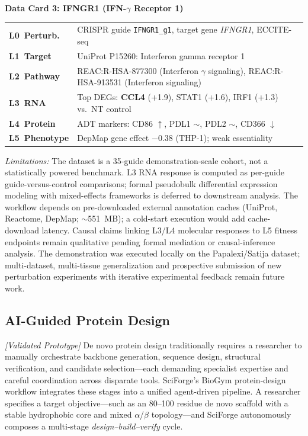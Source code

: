 \documentclass[sn-basic,Numbered,pdflatex]{sn-jnl}
\begin{document}
\vspace{6pt}

\noindent\colorbox{gray!20}{\textbf{\small Data Card 3: IFNGR1 (IFN-$\gamma$ Receptor 1)}}
\vspace{3pt}

\noindent\begin{tabular}{@{}p{2.5cm} p{\dimexpr\textwidth-2.5cm-12pt\relax}@{}}
\cellcolor{blue!15} \textbf{L0~Perturb.} & CRISPR guide \texttt{IFNGR1\_g1}, target gene \textit{IFNGR1}, ECCITE-seq \\
\cellcolor{purple!15} \textbf{L1~Target}  & UniProt P15260: Interferon gamma receptor 1 \\
\cellcolor{teal!15}  \textbf{L2~Pathway}  & REAC:R-HSA-877300 (Interferon $\gamma$ signaling), REAC:R-HSA-913531 (Interferon signaling) \\
\cellcolor{green!15} \textbf{L3~RNA}      & Top DEGs: \textbf{CCL4} (+1.9), STAT1 (+1.6), IRF1 (+1.3) vs.\ NT control \\
\cellcolor{orange!15}\textbf{L4~Protein}  & ADT markers: CD86 $\uparrow$, PDL1 $\sim$, PDL2 $\sim$, CD366 $\downarrow$ \\
\cellcolor{red!15}   \textbf{L5~Phenotype}& DepMap gene effect $-0.38$ (THP-1); weak essentiality \\
\end{tabular}
\textit{Limitations:} The dataset is a 35-guide demonstration-scale cohort, not a statistically powered benchmark. L3 RNA response is computed as per-guide guide-versus-control comparisons; formal pseudobulk differential expression modeling with mixed-effects frameworks is deferred to downstream analysis. The workflow depends on pre-downloaded external annotation caches (UniProt, Reactome, DepMap; $\sim$551~MB); a cold-start execution would add cache-download latency. Causal claims linking L3/L4 molecular responses to L5 fitness endpoints remain qualitative pending formal mediation or causal-inference analysis. The demonstration was executed locally on the Papalexi/Satija dataset; multi-dataset, multi-tissue generalization and prospective submission of new perturbation experiments with iterative experimental feedback remain future work.

\FloatBarrier
\subsection{AI-Guided Protein Design}

\textit{[Validated Prototype]} De novo protein design traditionally requires a researcher to manually orchestrate backbone generation, sequence design, structural verification, and candidate selection---each demanding specialist expertise and careful coordination across disparate tools. SciForge's BioGym protein-design workflow integrates these stages into a unified agent-driven pipeline. A researcher specifies a target objective---such as an 80--100 residue de novo scaffold with a stable hydrophobic core and mixed $\alpha$/$\beta$ topology---and SciForge autonomously composes a multi-stage \emph{design--build--verify} cycle.
\end{document}

